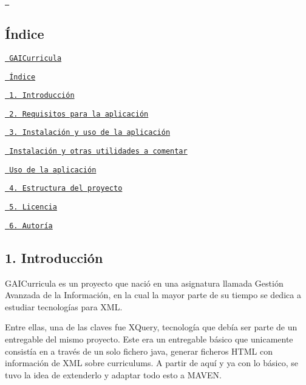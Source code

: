 \href{https://github.com/cs-ehu/GAICurricula/releases}{\texttt{ }}

\subsection*{Índice}


\begin{DoxyItemize}
\item \href{\#gaicurricula}{\texttt{ G\+A\+I\+Curricula}}
\begin{DoxyItemize}
\item \href{\#Índice}{\texttt{ Índice}}
\item \href{\#1-introducción}{\texttt{ 1. Introducción}}
\item \href{\#2-requisitos-para-la-aplicación}{\texttt{ 2. Requisitos para la aplicación}}
\item \href{\#3-instalación-y-uso-de-la-aplicación}{\texttt{ 3. Instalación y uso de la aplicación}}
\begin{DoxyItemize}
\item \href{\#instalación-y-otras-utilidades-a-comentar}{\texttt{ Instalación y otras utilidades a comentar}}
\item \href{\#uso-de-la-aplicación}{\texttt{ Uso de la aplicación}}
\end{DoxyItemize}
\item \href{\#4-estructura-del-proyecto}{\texttt{ 4. Estructura del proyecto}}
\item \href{\#5-licencia}{\texttt{ 5. Licencia}}
\item \href{\#6-autoría}{\texttt{ 6. Autoría}}
\end{DoxyItemize}
\end{DoxyItemize}

\subsection*{1. Introducción}

G\+A\+I\+Curricula es un proyecto que nació en una asignatura llamada Gestión Avanzada de la Información, en la cual la mayor parte de su tiempo se dedica a estudiar tecnologías para X\+ML.

Entre ellas, una de las claves fue X\+Query, tecnología que debía ser parte de un entregable del mismo proyecto. Este era un entregable básico que unicamente consistía en a través de un solo fichero java, generar ficheros H\+T\+ML con información de X\+ML sobre curriculums. A partir de aquí y ya con lo básico, se tuvo la idea de extenderlo y adaptar todo esto a M\+A\+V\+EN.

